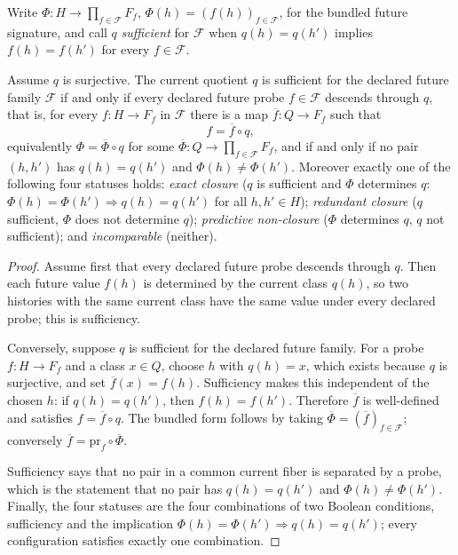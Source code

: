 Write \(\Phi:H\to\prod_{f\in\mathcal F}F_f\), \(\Phi(h)=(f(h))_{f\in\mathcal F}\),
for the bundled future signature, and call \(q\) \emph{sufficient} for
\(\mathcal F\) when \(q(h)=q(h')\) implies \(f(h)=f(h')\) for every
\(f\in\mathcal F\).

\begin{theorem}\label{thm:F7}
Assume \(q\) is surjective. The current quotient \(q\) is sufficient
for the declared future family \(\mathcal F\) if and only if every declared
future probe \(f\in\mathcal F\) descends through \(q\), that is, for every
\(f:H\to F_f\) in \(\mathcal F\) there is a map
\(\overline f:Q\to F_f\) such that
\[
  f=\overline f\circ q ,
\]
equivalently \(\Phi=\overline\Phi\circ q\) for some
\(\overline\Phi:Q\to\prod_{f\in\mathcal F}F_f\), and if and only if no pair \((h,h')\) has \(q(h)=q(h')\) and
\(\Phi(h)\ne\Phi(h')\). Moreover exactly one of the following four statuses
holds: \emph{exact closure} (\(q\) is sufficient and \(\Phi\) determines \(q\): \(\Phi(h)=\Phi(h')\Rightarrow q(h)=q(h')\) for all \(h,h'\in H\)); \emph{redundant closure} (\(q\) sufficient, \(\Phi\) does not determine \(q\)); \emph{predictive non-closure} (\(\Phi\) determines \(q\), \(q\) not sufficient); and \emph{incomparable} (neither).
\end{theorem}
\begin{proof}
Assume first that every declared future probe descends through
\(q\).  Then each future value \(f(h)\) is determined by the current
class \(q(h)\), so two histories with the same current class have the
same value under every declared probe; this is sufficiency.

Conversely, suppose \(q\) is sufficient for the declared future family.
For a probe \(f:H\to F_f\) and a class \(x\in Q\), choose \(h\) with
\(q(h)=x\), which exists because \(q\) is surjective, and set
\(\overline f(x)=f(h)\). Sufficiency makes this independent of the chosen
\(h\): if \(q(h)=q(h')\), then \(f(h)=f(h')\). Therefore \(\overline f\) is
well-defined and satisfies \(f=\overline f\circ q\). The bundled form follows
by taking \(\overline\Phi=(\overline f)_{f\in\mathcal F}\); conversely
\(\overline f=\mathrm{pr}_f\circ\overline\Phi\).

Sufficiency says that no pair in a common current fiber is separated by a
probe, which is the statement that no pair has \(q(h)=q(h')\) and
\(\Phi(h)\ne\Phi(h')\). Finally, the four statuses are the four
combinations of two Boolean conditions, sufficiency and the implication
\(\Phi(h)=\Phi(h')\Rightarrow q(h)=q(h')\); every configuration satisfies
exactly one combination.
\end{proof}

